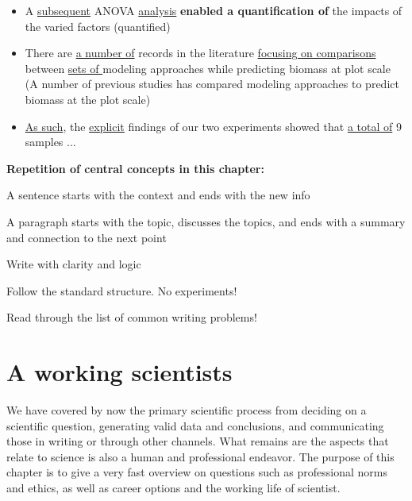 \documentclass{tufte-book}
\begin{document}
\begin{itemize}

\item A \uline{subsequent} ANOVA \uline{analysis} \textbf{enabled a quantification of} the impacts of the varied factors (quantified)

\item There are \uline{a number of} records in the literature \uline{focusing on comparisons} between \uline{sets of }modeling approaches while predicting biomass at plot scale (A number of previous studies has compared modeling approaches to predict biomass at the plot scale)

\item \uline{As such}, the \uline{explicit} findings of our two experiments showed that \uline{a total of} 9 samples ... 

\end{itemize}


\vspace{1cm}
\begin{mdframed}
    
\textbf{Repetition of central concepts in this chapter:} 

\begin{itemize*}
  \item A sentence starts with the context and ends with the new info
  \item A paragraph starts with the topic, discusses the topics, and ends with a summary and connection to the next point
  \item Write with clarity and logic
  \item Follow the standard structure. No experiments!
  \item Read through the list of common writing problems!
\end{itemize*}

\end{mdframed}

\chapter{A working scientists}

We have covered by now the primary scientific process from deciding on a scientific question, generating valid data and conclusions, and communicating those in writing or through other channels. What remains are the aspects that relate to science is also a human and professional endeavor. The purpose of this chapter is to give a very fast overview on questions such as professional norms and ethics, as well as career options and the working life of scientist.
\end{document}
